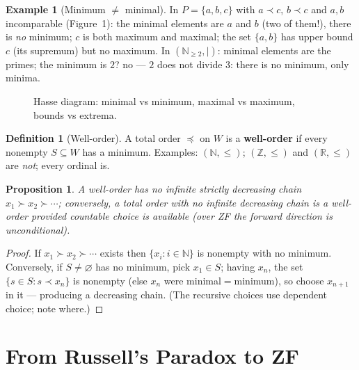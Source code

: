 \documentclass[11pt,a4paper]{article}
\newtheorem{proposition}[theorem]{Proposition}
\theoremstyle{definition}
\newtheorem{definition}[theorem]{Definition}
\newtheorem{example}[theorem]{Example}
\newcommand{\Z}{\mathbb{Z}}
\newcommand{\R}{\mathbb{R}}
\newcommand{\N}{\mathbb{N}}
\begin{document}
\begin{example}[Minimum $\neq$ minimal]\label{ex:minimal}
In $P=\{a,b,c\}$ with $a\prec c$, $b\prec c$ and $a,b$ incomparable (Figure~1): the minimal elements
are $a$ and $b$ (two of them!), there is \emph{no} minimum; $c$ is both maximum and maximal; the set
$\{a,b\}$ has upper bound $c$ (its supremum) but no maximum. In $(\N_{\ge2},\mid)$: minimal elements
are the primes; the minimum is $2$? no --- $2$ does not divide $3$: there is no minimum, only minima.
\end{example}

\begin{figure}[h]
\centering
{}
\caption{Hasse diagram: minimal vs minimum, maximal vs maximum, bounds vs extrema.}
\end{figure}

\begin{definition}[Well-order]
A total order $\preceq$ on $W$ is a \textbf{well-order} if every nonempty $S\subseteq W$ has a
minimum. Examples: $(\N,\le)$; $(\Z,\le)$ and $(\R,\le)$ are \emph{not}; every ordinal is.
\end{definition}

\begin{proposition}\label{prop:wo-basic}
A well-order has no infinite strictly decreasing chain $x_1\succ x_2\succ\cdots$; conversely, a total
order with no infinite decreasing chain is a well-order \emph{provided} countable choice is available
(over ZF the forward direction is unconditional).
\end{proposition}
\begin{proof}
If $x_1\succ x_2\succ\cdots$ exists then $\{x_i:i\in\N\}$ is nonempty with no minimum. Conversely, if
$S\neq\varnothing$ has no minimum, pick $x_1\in S$; having $x_n$, the set $\{s\in S:s\prec x_n\}$ is
nonempty (else $x_n$ were minimal$=$minimum), so choose $x_{n+1}$ in it --- producing a decreasing
chain. (The recursive choices use dependent choice; note where.)
\end{proof}

\section{From Russell's Paradox to ZF}
\end{document}
